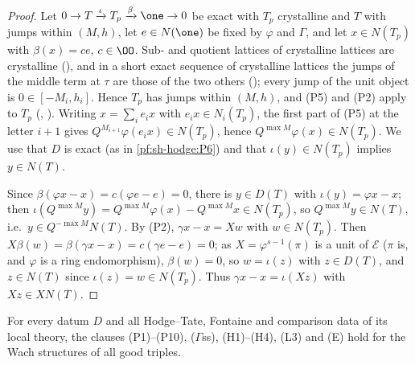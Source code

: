 \begin{proof}
Let $0\to T\xrightarrow{\iota}T_p\xrightarrow{\beta}\one\to0$ be exact with $T_p$ crystalline and $T$ with jumps within $(M,h)$, let $e\in N(\one)$ be fixed by
$\varphi$ and $\Gamma$, and let $x\in N(T_p)$ with $\beta(x)=ce$, $c\in\OO$. Sub- and quotient lattices of crystalline lattices are crystalline
(), and in a short exact sequence of crystalline lattices the jumps of the middle term at $\tau$
are those of the two others (); every jump of the unit object is $0\in[-M_i,h_i]$.
Hence $T_p$ has jumps within
$(M,h)$, and (P5) and (P2) apply to $T_p$ (,
). Writing $x=\sum_ie_ix$ with $e_ix\in N_i(T_p)$, the
first part of (P5) at the letter $i+1$ gives $Q^{M_{i+1}}\varphi(e_ix)\in N(T_p)$, hence $Q^{\max M}\varphi(x)\in N(T_p)$. We use that $D$ is exact (as in
\cref{pf:sh-hodge:P6}) and that $\iota(y)\in N(T_p)$ implies $y\in N(T)$.

Since $\beta(\varphi x-x)=c(\varphi e-e)=0$, there is $y\in D(T)$ with $\iota(y)=\varphi x-x$; then $\iota(Q^{\max M}y)=Q^{\max M}\varphi(x)-Q^{\max M}x\in N(T_p)$,
so $Q^{\max M}y\in N(T)$, i.e.\ $y\in Q^{-\max M}N(T)$. By (P2), $\gamma x-x=Xw$ with $w\in N(T_p)$. Then $X\beta(w)=\beta(\gamma x-x)=c(\gamma e-e)=0$; as $X=
\varphi^{s-1}(\pi)$ is a unit of $\mathcal E$ ($\pi$ is, and $\varphi$ is a ring endomorphism), $\beta(w)=0$, so $w=\iota(z)$ with $z\in D(T)$, and $z\in N(T)$ since
$\iota(z)=w\in N(T_p)$. Thus $\gamma x-x=\iota(Xz)$ with $Xz\in XN(T)$.
\end{proof}

\begin{theorem}\label{pf:sh-hodge:wach}
For every datum $D$ and all Hodge--Tate, Fontaine and comparison data of its local theory, the clauses (P1)--(P10), ($\Gamma$ss), (H1)--(H4),
(L3) and (E) hold for the Wach structures of all good triples.
\end{theorem}

